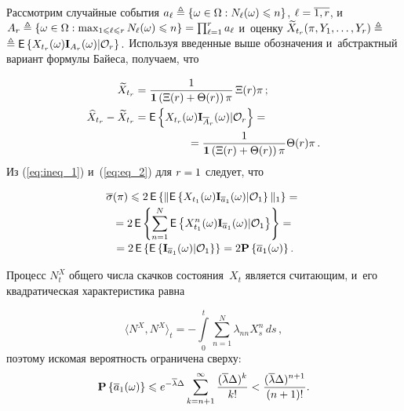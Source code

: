 \begin{multicols}{2}
{ 
 \noindent
 Рассмотрим случайные события $a_{\ell} \ebd \{\omega \in \Omega: 
 N_{\ell}(\omega) \hm\leqslant n\}$, $\ell \hm= \overline{1,r}$, и~$A_r \ebd \{
 \omega\hm \in \Omega: \max_{1 \leqslant {\ell} \leqslant r}N_{\ell}(\omega) 
 \hm\leqslant n
 \}\hm=\prod\nolimits_{\ell=1}^r a_{\ell}$ и~оценку 
 $
 \widetilde{X}_{t_r}(\pi, Y_1,\ldots,Y_r)\triangleq$\linebreak $\triangleq
 {\sf E}\left\{X_{t_r}(\omega)\mathbf{I}_{A_r}(\omega)|\mathcal{O}_r\right\}.
 $
 Используя введенные выше обозначе\-ния и~абстрактный вариант формулы Байеса, 
 получаем, что
 
 \noindent
\begin{align}
\widetilde{X}_{t_r}& = \fr{1}{{\mathbf{1}\left(\Xi(r) + 
 \Theta(r)\right)\pi}}\,\Xi(r)\pi\,;\notag
 \\
\widehat{X}_{t_r} - \widetilde{X}_{t_r} &=
{\sf E}\left\{X_{t_r}(\omega)\mathbf{I}_{\overline{A}_r}(\omega)|\mathcal{O}_r\right\} ={}\notag\\[-1pt]
&\hspace*{17mm}{}= 
\fr{1}{\mathbf{1}\left(\Xi(r) + \Theta(r)\right)\pi}\Theta(r)\pi\,. 
\label{eq:eq_2}
 \end{align}
 Из (\ref{eq:ineq_1}) и~(\ref{eq:eq_2}) для $r\hm=1$ следует, что
 
 \vspace*{-4pt}
 
 \noindent
 \begin{multline}
 \overline{\sigma}(\pi) \leqslant 2\,{\sf E}
 \left\{\|{\sf E}\left\{X_{t_1}(\omega)\mathbf{I}_{\overline{a}_1}(\omega)|\mathcal{O}_1
 \right\}\|_1
 \right\} ={}\\[-1.5pt]
 {}=
 2\,{\sf E}\left\{\sum\limits_{n=1}^N {\sf E}
 \left\{X^n_{t_1}(\omega)\mathbf{I}_{\overline{a}_1}
 (\omega)|\mathcal{O}_1\right\}\right\} ={} \\[-2pt] 
 {}=
  2\,{\sf E}\left\{{\sf E}\left\{\mathbf{I}_{\overline{a}_1}(\omega)|\mathcal{O}_1
  \right\}\right\} =
   2 \mathbf{P}\left\{\overline{a}_1(\omega)\right\}.
\label{eq:ineq_3}
\end{multline}

 \vspace*{-2pt}
 
 \noindent
 Процесс $N^X_t$ общего числа скачков состояния~$X_t$ является считающим, и~его
  квадратическая характеристика равна 
  
\vspace*{-2pt}
  
  \noindent
 $$
 \langle N^X, N^X\rangle_t = - \int\limits_0^t \sum\limits_{n=1}^N \lambda_{nn} X_s^n\,ds\,,
 $$
 поэтому искомая вероятность ограничена сверху:
 $$ 
 \mathbf{P}\left\{\overline{a}_1(\omega)\right\} \leqslant 
 e^{-\overline{\lambda}\Delta}\sum\limits_{k=n+1}^{\infty} 
 \displaystyle\frac{\displaystyle (\overline{\lambda}\Delta)^{k}\mathstrut}{\displaystyle k!\mathstrut} <
 \displaystyle\frac{\displaystyle (\overline{\lambda}\Delta)^{n+1}\mathstrut}{\displaystyle (n+1)!\mathstrut}.
 $$
 
}
\end{multicols}
